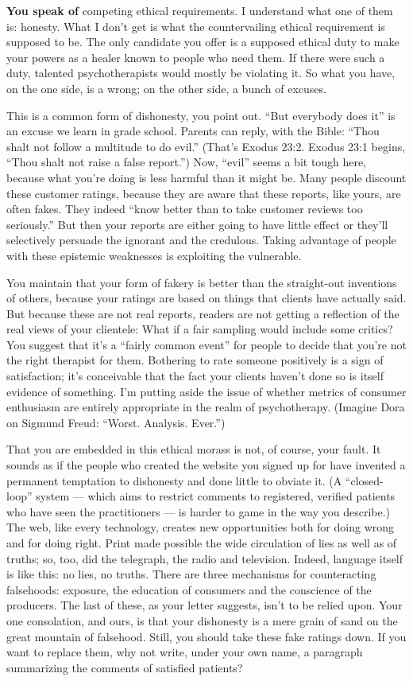 \textbf{You speak of} competing ethical requirements. I understand what
one of them is: honesty. What I don't get is what the countervailing
ethical requirement is supposed to be. The only candidate you offer is a
supposed ethical duty to make your powers as a healer known to people
who need them. If there were such a duty, talented psychotherapists
would mostly be violating it. So what you have, on the one side, is a
wrong; on the other side, a bunch of excuses.

This is a common form of dishonesty, you point out. ``But everybody does
it'' is an excuse we learn in grade school. Parents can reply, with the
Bible: ``Thou shalt not follow a multitude to do evil.'' (That's Exodus
23:2. Exodus 23:1 begins, ``Thou shalt not raise a false report.'') Now,
``evil'' seems a bit tough here, because what you're doing is less
harmful than it might be. Many people discount these customer ratings,
because they are aware that these reports, like yours, are often fakes.
They indeed ``know better than to take customer reviews too seriously.''
But then your reports are either going to have little effect or they'll
selectively persuade the ignorant and the credulous. Taking advantage of
people with these epistemic weaknesses is exploiting the vulnerable.

You maintain that your form of fakery is better than the straight-out
inventions of others, because your ratings are based on things that
clients have actually said. But because these are not real reports,
readers are not getting a reflection of the real views of your
clientele: What if a fair sampling would include some critics? You
suggest that it's a ``fairly common event'' for people to decide that
you're not the right therapist for them. Bothering to rate someone
positively is a sign of satisfaction; it's conceivable that the fact
your clients haven't done so is itself evidence of something. I'm
putting aside the issue of whether metrics of consumer enthusiasm are
entirely appropriate in the realm of psychotherapy. (Imagine Dora on
Sigmund Freud: ``Worst. Analysis. Ever.'')

That you are embedded in this ethical morass is not, of course, your
fault. It sounds as if the people who created the website you signed up
for have invented a permanent temptation to dishonesty and done little
to obviate it. (A ``closed-loop'' system --- which aims to restrict
comments to registered, verified patients who have seen the
practitioners --- is harder to game in the way you describe.) The web,
like every technology, creates new opportunities both for doing wrong
and for doing right. Print made possible the wide circulation of lies as
well as of truths; so, too, did the telegraph, the radio and television.
Indeed, language itself is like this: no lies, no truths. There are
three mechanisms for counteracting falsehoods: exposure, the education
of consumers and the conscience of the producers. The last of these, as
your letter suggests, isn't to be relied upon. Your one consolation, and
ours, is that your dishonesty is a mere grain of sand on the great
mountain of falsehood. Still, you should take these fake ratings down.
If you want to replace them, why not write, under your own name, a
paragraph summarizing the comments of satisfied patients?

